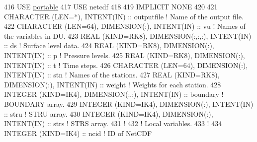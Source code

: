 \begin{DoxyCode}
416     \textcolor{keywordtype}{USE }\hyperlink{namespaceportable}{portable}
417     \textcolor{keywordtype}{USE }netcdf
418 
419     \textcolor{keywordtype}{IMPLICIT NONE}
420 
421     \textcolor{keywordtype}{CHARACTER (LEN=*)}, \textcolor{keywordtype}{INTENT(IN)}                                       :: outputfile   \textcolor{comment}{! Name of the
       output file.}
422     \textcolor{keywordtype}{CHARACTER (LEN=64)}, \textcolor{keywordtype}{DIMENSION(:)}, \textcolor{keywordtype}{INTENT(IN)}                        :: vu           \textcolor{comment}{! Names of the
       variables in DU.}
423     \textcolor{keywordtype}{REAL (KIND=RK8)}, \textcolor{keywordtype}{DIMENSION(:,:,:)}, \textcolor{keywordtype}{INTENT(IN)}                       :: ds           \textcolor{comment}{! Surface level
       data.}
424     \textcolor{keywordtype}{REAL (KIND=RK8)}, \textcolor{keywordtype}{DIMENSION(:)}, \textcolor{keywordtype}{INTENT(IN)}                           :: p            \textcolor{comment}{! Pressure levels.}
425     \textcolor{keywordtype}{REAL (KIND=RK8)}, \textcolor{keywordtype}{DIMENSION(:)}, \textcolor{keywordtype}{INTENT(IN)}                           :: t            \textcolor{comment}{! Time steps.      
          }
426     \textcolor{keywordtype}{CHARACTER (LEN=64)}, \textcolor{keywordtype}{DIMENSION(:)}, \textcolor{keywordtype}{INTENT(IN)}                        :: stn          \textcolor{comment}{! Names of the
       stations.}
427     \textcolor{keywordtype}{REAL (KIND=RK8)}, \textcolor{keywordtype}{DIMENSION(:)}, \textcolor{keywordtype}{INTENT(IN)}                           :: weight       \textcolor{comment}{! Weights for each
       station.}
428     \textcolor{keywordtype}{INTEGER (KIND=IK4)}, \textcolor{keywordtype}{DIMENSION(:,:)}, \textcolor{keywordtype}{INTENT(IN)}                      :: boundary     \textcolor{comment}{! BOUNDARY array.}
429     \textcolor{keywordtype}{INTEGER (KIND=IK4)}, \textcolor{keywordtype}{DIMENSION(:)}, \textcolor{keywordtype}{INTENT(IN)}                        :: stru         \textcolor{comment}{! STRU array.}
430     \textcolor{keywordtype}{INTEGER (KIND=IK4)}, \textcolor{keywordtype}{DIMENSION(:)}, \textcolor{keywordtype}{INTENT(IN)}                        :: strs         \textcolor{comment}{! STRS array.}
431     \textcolor{comment}{!}
432     \textcolor{comment}{! Local variables.}
433     \textcolor{comment}{!}
434     \textcolor{keywordtype}{INTEGER (KIND=IK4)}          :: ncid                                                 \textcolor{comment}{! ID of NetCDF
}
\end{DoxyCode}
